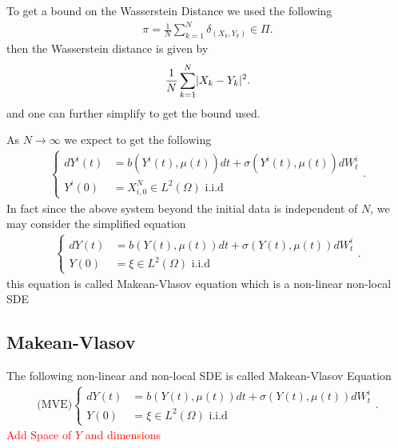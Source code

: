 \begin{remark}
 To get a bound on the Wasserstein Distance we used the following  
  \begin{align*}
    \pi  = \frac{1}{N} \sum_{k=1}^{N} \delta_{(X_k,Y_k)}  \in  \Pi
  .\end{align*}
  then  the Wasserstein distance is given by 
  \begin{align*}
   \frac{1}{N}\sum_{k=1}^{N} \lvert X_k-Y_k\rvert^2  
  .\end{align*}
  and one can further simplify to get the bound used.
\end{remark}
\begin{remark}
  As $N \to \infty$ we expect to get the following 
  \begin{align*}
    \begin{cases}
      dY^{i}(t) &= b(Y^{i}(t) ,\mu(t) ) dt + \sigma(Y^{i}(t),\mu(t) )dW_t^i \\
      Y^{i}(0)  &=  X_{i,0}^{N} \in  L^2(\Omega ) \text{ i.i.d} 
    \end{cases}
  .\end{align*}
  In fact since the above system beyond the initial data is independent of $N$, we may consider the simplified equation
  \begin{align*}
    \begin{cases}
      dY(t) &= b(Y(t) ,\mu(t) ) dt + \sigma(Y(t),\mu(t) )dW_t^i \\
      Y(0)  &=  \xi \in  L^2(\Omega ) \text{ i.i.d} 
    \end{cases}
  .\end{align*}
this equation is called Makean-Vlasov equation which is a non-linear non-local SDE
\end{remark}
\newpage
\subsection{Makean-Vlasov}
\begin{definition}\label{MVE}
  The following non-linear and non-local SDE is called Makean-Vlasov Equation 
\begin{align*}
    \text{(MVE)} \begin{cases}
      dY(t) &= b(Y(t) ,\mu(t) ) dt + \sigma(Y(t),\mu(t) )dW_t^i \\
      Y(0)  &=  \xi \in  L^2(\Omega ) \text{ i.i.d} 
    \end{cases}
  .\end{align*}  
\textcolor{Red}{Add Space of $Y$ and dimensions} 
\end{definition}

